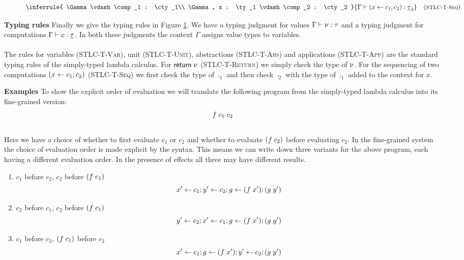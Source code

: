 {\begin{figure}
{\begin{minipage}{14 cm}
\[\inferrule{
	\Gamma \vdash \comp_1 : \cty_1\\
	\Gamma, x : \ty_1 \vdash \comp_2 : \cty_2
}{
	\Gamma \vdash (\cdo{x}{\comp_1}{\comp_2}) : \cty_2
}\quad(\footnotesize\textsc{STLC-T-Seq})\]
\label{fig:typing-stlc}
\end{minipage}
}
\end{figure}

\textbf{Typing rules}
Finally we give the typing rules in Figure \ref{fig:typing-stlc}.
We have a typing judgment for values $\Gamma \vdash \nu : \tau$ and a typing judgment for computations $\Gamma \vdash c : \underline{\tau}$.
In both these judgments the context $\Gamma$ assigns value types to variables.
\\\\
The rules for variables ({\footnotesize\textsc{STLC-T-Var}}), unit ({\footnotesize\textsc{STLC-T-Unit}}), abstractions ({\footnotesize\textsc{STLC-T-Abs}}) and applications ({\footnotesize\textsc{STLC-T-App}}) are the standard typing rules of the simply-typed lambda calculus.
For $\mathsf{return} \; \nu$ ({\footnotesize\textsc{STLC-T-Return}}) we simply check the type of $\nu$.
For the sequencing of two computations $(x \leftarrow c_1 ; c_2)$ ({\footnotesize\textsc{STLC-T-Seq}}) we first check the type of $\comp_1$ and then check $\comp_2$ with the type of $\comp_1$ added to the context for $x$.

\textbf{Examples}
To show the explicit order of evaluation we will translate the following program from the simply-typed lambda calculus into its fine-grained version:\\
\[f \; c_1 \; c_2\]\\
Here we have a choice of whether to first evaluate $c_1$ or $c_2$ and whether to evaluate $(f \; c_2)$ before evaluating $c_2$.
In the fine-grained system the choice of evaluation order is made explicit by the syntax.
This means we can write down three variants for the above program, each having a different evaluation order.
In the presence of effects all three may have different results.

\begin{enumerate}
\itemsep0em 
\item $c_1$ before $c_2$, $c_2$ before $(f \; c_1)$ 
\[x' \leftarrow c_1 ; y' \leftarrow c_2 ; g \leftarrow (f \; x') ; (g \; y')\]
\item $c_2$ before $c_1$, $c_2$ before $(f \; c_1)$
\[y' \leftarrow c_2 ; x' \leftarrow c_1 ; g \leftarrow (f \; x') ; (g \; y')\]
\item $c_1$ before $c_2$, $(f \; c_1)$ before $c_2$
\[x' \leftarrow c_1 ; g \leftarrow (f \; x') ; y' \leftarrow c_2 ; (g \; y')\]
\end{enumerate}

}
